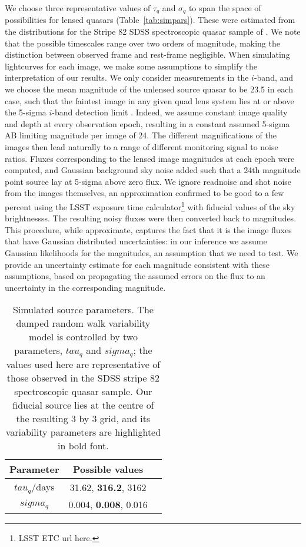 \documentclass[useAMS,usenatbib, a4paper]{mn2e} \usepackage{natbib}
\begin{document}
We choose three representative values of $\tau_q$ and $\sigma_q$ to span the
space of possibilities for lensed quasars (Table~\ref{tab:simpars}).  These
were estimated from the  distributions for the Stripe 82 SDSS spectroscopic
quasar sample of \citet{Kel++09}. We note that the possible timescales range
over two orders of magnitude, making the distinction between observed frame
and rest-frame negligible. When simulating lightcurves for each image, we make
some assumptions to simplify the interpretation of our results. We only
consider measurements in the $i$-band, and we choose the mean magnitude of the
unlensed source quasar to be 23.5 in each case, such that the faintest image
in any given quad lens system lies at or above the 5-sigma $i$-band detection
limit \citep{Ive++10}. Indeed, we assume constant image quality and depth at
every observation epoch, resulting in a constant assumed 5-sigma AB limiting
magnitude per image of 24. 
The different magnifications of the images then lead
naturally to a range of different monitoring signal to noise ratios.
Fluxes corresponding to the lensed image magnitudes
at each epoch were computed, and Gaussian background sky noise added such that a 24th
magnitude point source lay at 5-sigma above zero flux. We ignore readnoise and
shot noise
from the images themselves, an approximation confirmed to be good to a few
percent using the LSST exposure time calculator\footnote{LSST ETC url here.}
with fiducial values of the
sky brightnessss. 
The resulting noisy
fluxes were then converted back to magnitudes. This procedure, while
approximate, captures the fact that it is the image fluxes that have Gaussian
distributed uncertainties: in our inference we assume Gaussian likelihoods for
the magnitudes, an assumption that we need to test. We provide an uncertainty
estimate for each magnitude consistent with these assumptions, based on
propagating the assumed errors on the flux to an uncertainty in the
corresponding magnitude.

\begin{table}
\begin{center}
\begin{tabular}{ccc}
\hline
Parameter      & Possible values \\
\hline\hline
$tau_q$/days   & 31.62, {\bf 316.2}, 3162  \\ 
$sigma_q$      & 0.004, {\bf 0.008}, 0.016 \\ 
\hline
\end{tabular}
\end{center}
\caption{Simulated source parameters. The damped random walk variability model
is controlled by two parameters, $tau_q$ and $sigma_q$; the values used here
are representative of those observed in the SDSS stripe 82 spectroscopic 
quasar sample. Our fiducial source lies at the centre of the resulting 3 by 3
grid, and its variability parameters are highlighted in bold font.
\label{tab:simsrc}}
\end{table}
\end{document}
